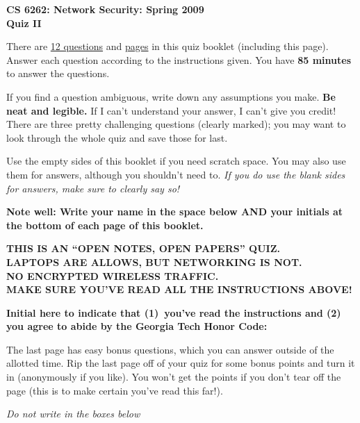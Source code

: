 \documentclass[11pt]{article}
\newcounter{answer}
\begin{document}
\begin{center}
{\Large{\bf CS 6262: Network Security: Spring 2009} \\
 \vspace{.15in} \Huge{\bf Quiz II}} 
\vspace{.2in}

\begin{boxedminipage}[h]{6in}
There are \underline{12 questions} and
  \underline{\pageref{lastpage} pages} in this quiz booklet (including
  this page).  Answer each question according to the instructions given.
  You have {\bf 85 minutes} to answer the questions.



\vspace{.1in} 
If you find a question ambiguous, write down any
assumptions you make.  {\bf Be neat and legible.}  If I can't
understand your answer, I can't give you credit!  There are three pretty
challenging questions (clearly marked); you may want to look through the
whole quiz and save those for last.

\vspace{.1in} 
Use the empty sides of this booklet if you need scratch space.  You
may also use them for answers, although you shouldn't need to.  {\em If you
do use the blank sides for answers, make sure to clearly say so!}

\vspace{.1in} 
{\bf Note well: Write your name in the space below AND your initials at the bottom of each
page of this booklet.}

\begin{center}{\bf THIS IS AN ``OPEN NOTES, OPEN PAPERS'' QUIZ.\\
LAPTOPS ARE ALLOWS, BUT NETWORKING IS NOT. \\
NO ENCRYPTED WIRELESS TRAFFIC. \\
MAKE SURE YOU'VE READ ALL THE INSTRUCTIONS ABOVE!}
\end{center}
{\bf Initial here to indicate that (1)~you've read the instructions and (2)~
you agree to abide by the Georgia Tech Honor Code: }

\vspace{0in} The last page has easy bonus questions, which you can
answer outside of the allotted time.  Rip the last page off of your
quiz for some bonus points and turn it in (anonymously if you like).  You
won't get the points if you don't tear off the page (this is to
make certain you've read this far!).

\end{boxedminipage}
\end{center}
\vspace*{0.25in}
\begin{center}
{\it Do not write in the boxes below}
\end{center}
\end{document}
